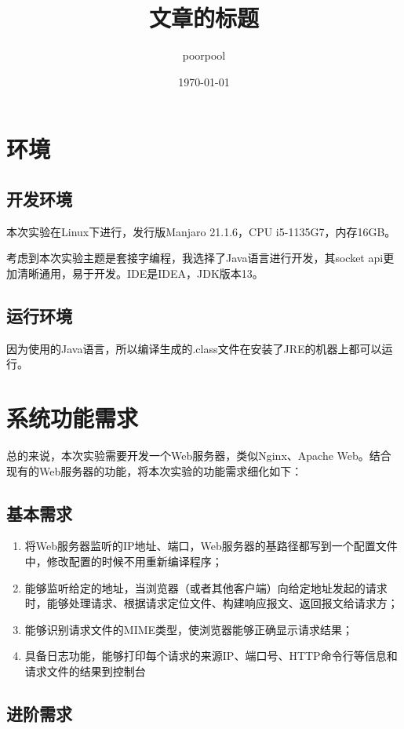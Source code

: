 \documentclass[UTF8,12pt]{ctexart}
\title{\bfseries 文章的标题}
\author{poorpool}
\date{\today}
\begin{document}
	
\section{环境}

\subsection{开发环境}

本次实验在Linux下进行，发行版Manjaro 21.1.6，CPU i5-1135G7，内存16GB。

考虑到本次实验主题是套接字编程，我选择了Java语言进行开发，其socket api更加清晰通用，易于开发。IDE是IDEA，JDK版本13。

\subsection{运行环境}

因为使用的Java语言，所以编译生成的.class文件在安装了JRE的机器上都可以运行。

\section{系统功能需求}

总的来说，本次实验需要开发一个Web服务器，类似Nginx、Apache Web。结合现有的Web服务器的功能，将本次实验的功能需求细化如下：

\subsection{基本需求}

\begin{enumerate}
	\item 将Web服务器监听的IP地址、端口，Web服务器的基路径都写到一个配置文件中，修改配置的时候不用重新编译程序；
	\item 能够监听给定的地址，当浏览器（或者其他客户端）向给定地址发起的请求时，能够处理请求、根据请求定位文件、构建响应报文、返回报文给请求方；
	\item 能够识别请求文件的MIME类型，使浏览器能够正确显示请求结果；
	\item 具备日志功能，能够打印每个请求的来源IP、端口号、HTTP命令行等信息和请求文件的结果到控制台
\end{enumerate}

\subsection{进阶需求}
\end{document}
